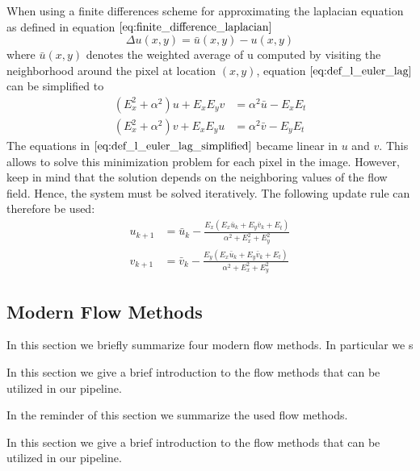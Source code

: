 When using a finite differences scheme for approximating the laplacian equation
as defined in equation $\ref{eq:finite_difference_laplacian}$
\begin{equation}
	\Delta u(x,y) = \bar{u} (x,y) - u(x,y)
\label{eq:finite_difference_laplacian}
\end{equation}
where $\bar{u} (x,y)$ denotes the weighted average of u computed by visiting the neighborhood around the pixel at location $(x,y)$, equation $\ref{eq:def_l_euler_lag}$ can be simplified to
\begin{equation}
\begin{aligned}
(E_x^2 + \alpha^2) u + E_x E_y v &= \alpha^2 \bar{u} - E_x E_t \\
(E_x^2 + \alpha^2) v + E_x E_y u &= \alpha^2 \bar{v} - E_y E_t
\end{aligned}
\label{eq:def_l_euler_lag_simplified}
\end{equation}
The equations in $\ref{eq:def_l_euler_lag_simplified}$ became linear in $u$ and $v$. This allows to solve this minimization problem for each pixel in the image. However, keep in mind that the solution depends on the neighboring values of the flow field. Hence, the system must be solved iteratively. The following update rule can therefore be used:
\begin{equation}
\begin{aligned}
 u_{k+1} &= \bar{u}_k - \frac{E_x (E_x \bar{u}_k + E_y \bar{v}_k + E_t)}{\alpha^2 + E_x^2 + E_y^2} \\
  v_{k+1} &= \bar{v}_k - \frac{E_y (E_x \bar{u}_k + E_y \bar{v}_k + E_t)}{\alpha^2 + E_x^2 + E_y^2}
\end{aligned}
\label{eq:hs_iteration}
\end{equation}

\subsection{Modern Flow Methods}
\label{sec:impl_optical_flow}
In this section we briefly summarize four modern flow methods. In particular we s

In this section we give a brief introduction to the flow methods that can be utilized in our pipeline.


In the reminder of this section we summarize the used flow methods.

In this section we give a brief introduction to the flow methods that can be utilized in our pipeline. 

%

